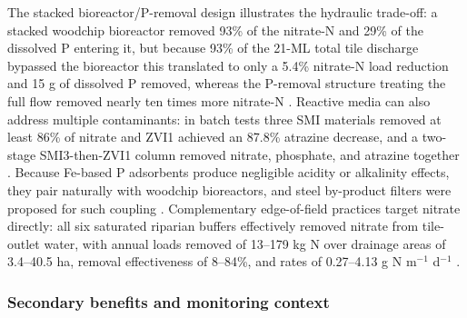 The stacked bioreactor/P-removal design illustrates the hydraulic trade-off: a stacked woodchip bioreactor removed 93\% of the nitrate-N and 29\% of the dissolved P entering it, but because 93\% of the 21-ML total tile discharge bypassed the bioreactor this translated to only a 5.4\% nitrate-N load reduction and 15 g of dissolved P removed, whereas the P-removal structure treating the full flow removed nearly ten times more nitrate-N \parencite{Penn2024}. Reactive media can also address multiple contaminants: in batch tests three SMI materials removed at least 86\% of nitrate and ZVI1 achieved an 87.8\% atrazine decrease, and a two-stage SMI3-then-ZVI1 column removed nitrate, phosphate, and atrazine together \parencite{Allred2012}. Because Fe-based P adsorbents produce negligible acidity or alkalinity effects, they pair naturally with woodchip bioreactors, and steel by-product filters were proposed for such coupling \parencite{Sellner2019b}. Complementary edge-of-field practices target nitrate directly: all six saturated riparian buffers effectively removed nitrate from tile-outlet water, with annual loads removed of 13--179 kg N over drainage areas of 3.4--40.5 ha, removal effectiveness of 8--84\%, and rates of 0.27--4.13 g N m$^{-1}$ d$^{-1}$ \parencite{Jaynes2019}.

\subsubsection{Secondary benefits and monitoring context}

